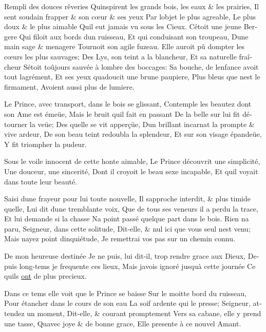 \documentclass[14pt,a4paper]{memoir}
\newcommand{\ul}[1]{\uline{#1}}
\begin{document}
\begin{otherlanguage}{french}
{Rempli des douces rêveries} {Qu\textquotesingle inspirent les grands
bois, les eaux \& les prairies,} {Il sent soudain frapper \& son cœur \&
ses yeux} {Par l\textquotesingle objet le plus agreable,} {Le plus doux
\& le plus aimable} {Qu\textquotesingle il eut jamais vu sous les
Cieux.} {C\textquotesingle étoit une jeune Bergere} {Qui filoit aux
bords d\textquotesingle un ruisseau,} {Et qui conduisant son troupeau,}
{D\textquotesingle une main sage \& menagere} {Tournoit son agile
fuzeau.} {Elle auroit pû dompter les cœurs les plus sauvages;} {Des Lys,
son teint a la blancheur,} {Et sa naturelle fraîcheur}
{S\textquotesingle étoit toûjours sauvée à l\textquotesingle ombre des
boccages: } {Sa bouche, de l\textquotesingle enfance avoit tout
l\textquotesingle agrément,} {Et ses yeux qu\textquotesingle adoucit une
brune paupiere,} {Plus bleus que n\textquotesingle est le firmament,}
{Avoient aussi plus de lumiere.}

{Le Prince, avec transport, dans le bois se glissant,} {Contemple les
beautez dont son Ame est émeüe,} {Mais le bruit qu\textquotesingle il
fait en passant} {De la belle sur lui fit détourner la veüe;} {Des
qu\textquotesingle elle se vit apperçüe,} {D\textquotesingle un brillant
incarnat la prompte \& vive ardeur,} {De son beau teint redoubla la
splendeur,} {Et sur son visage épandeüe,} {Y fit triompher la pudeur.}

{Sous le voile innocent de cette honte aimable,} {Le Prince découvrit
une simplicité,} {Une douceur, une sincerité,} {Dont il croyoit le beau
sexe incapable,} {Et qu\textquotesingle il voyait dans toute leur
beauté.}

{Saisi d\textquotesingle une frayeur pour lui toute nouvelle,} {Il
s\textquotesingle approche interdit, \& plus timide
qu\textquotesingle elle,} {Lui dit d\textquotesingle une tremblante
voix,} {Que de tous ses veneurs il a perdu la trace,} {Et lui demande si
la chasse} {N\textquotesingle a point passé quelque part dans le bois.}
{Rien n\textquotesingle a paru, Seigneur, dans cette solitude,}
{Dit-elle, \& nul ici que vous seul n\textquotesingle est venu; } {Mais
n\textquotesingle ayez point d\textquotesingle inquiétude,} {Je
remettrai vos pas sur un chemin connu.}

{De mon heureuse destinée} {Je ne puis, lui dit-il, trop rendre grace
aux Dieux,} {Depuis long-tems je frequente ces lieux,} {Mais
j\textquotesingle avois ignoré jusqu\textquotesingle à cette journée}
{Ce qu\textquotesingle ils \ul{ont} de plus precieux.}

{Dans ce tems elle voit que le Prince se baisse} {Sur le moitte bord du
ruisseau,} {Pour étancher dans le cours de son eau} {La soif ardente qui
le presse;} {Seigneur, attendez un moment,} {Dit-elle, \& courant
promptement} {Vers sa cabane, elle y prend une tasse,}
{Qu\textquotesingle avec joye \& de bonne grace,} {Elle presente à ce
nouvel Amant.}


\end{otherlanguage}
\end{document}
